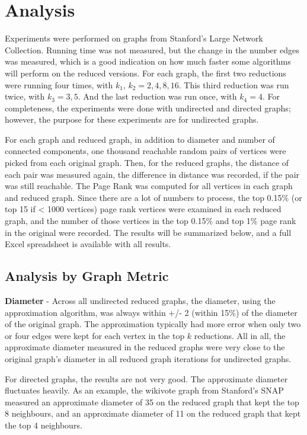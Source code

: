 \documentclass[11pt]{article}
\begin{document}
\section{Analysis}
Experiments were performed on graphs from Stanford's Large Network Collection.  Running time was not measured, but the change in the number edges was measured, which is a good indication on how much faster some algorithms will perform on the reduced versions.  For each graph, the first two reductions were running four times, with $k_1$, $k_2 = 2,4,8,16$.  This third reduction was run twice, with $k_3 = 3,5$.  And the last reduction was run once, with $k_4 = 4$.  For completeness, the experiments were done with undirected and directed graphs; however, the purpose for these experiments are for undirected graphs. 

For each graph and reduced graph, in addition to diameter and number of connected components, one thousand reachable random pairs of vertices were picked from each original graph.  Then, for the reduced graphs, the distance of each pair was measured again, the difference in distance was recorded, if the pair was still reachable.  The Page Rank was computed for all vertices in each graph and reduced graph.  Since there are a lot of numbers to process, the top 0.15\% (or top 15 if < 1000 vertices) page rank vertices were examined in each reduced graph, and the number of those vertices in the top 0.15\% and top 1\% page rank in the original were recorded.  The results will be summarized below, and a full Excel spreadsheet is available with all results.

\subsection{Analysis by Graph Metric}
\textbf{Diameter} - Across all undirected reduced graphs, the diameter, using the approximation algorithm, was always within +/- 2 (within 15\%) of the diameter of the original graph.  The approximation typically had more error when only two or four edges were kept for each vertex in the top $k$ reductions. All in all, the approximate diameter measured in the reduced graphs were very close to the original graph's diameter in all reduced graph iterations for undirected graphs.

For directed graphs, the results are not very good.  The approximate diameter fluctuates heavily.  As an example, the wikivote graph from Stanford's SNAP measured an approximate diameter of 35 on the reduced graph that kept the top 8 neighbours, and an approximate diameter of 11 on the reduced graph that kept the top 4 neighbours.
\end{document}
